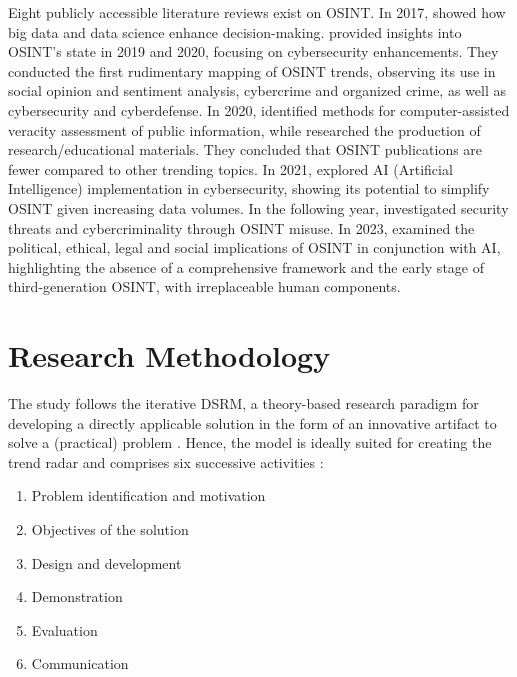 \documentclass[10pt]{article}
\begin{document}
Eight publicly accessible literature reviews exist on OSINT. In 2017, \cite{DosPassos.2017} showed how big data and data science enhance decision-making. \cite{PastorGalindo.2019, PastorGalindo.2020}
provided insights into OSINT's state in 2019 and 2020, focusing on cybersecurity
enhancements. They conducted the first rudimentary mapping of OSINT trends, observing its use in social opinion and sentiment
analysis, cybercrime and organized crime, as well as cybersecurity and cyberdefense. In 2020, \cite{GarciaLozano.2020} identified methods for computer-assisted veracity assessment of public information, while
\cite{HerreraCubides.2020} researched the production of research/educational materials. They concluded that OSINT
publications are fewer compared to other trending topics. In 2021, \cite{Yogish.2021} explored AI (Artificial Intelligence) implementation in cybersecurity,
showing its potential to simplify OSINT given increasing data volumes. In the following year,
\cite{Hwang.2022} investigated security threats and cybercriminality through OSINT misuse.
In 2023, \cite{Ghioni.2023} examined the political, ethical, legal and social implications of
OSINT in conjunction with AI, highlighting the absence of a comprehensive framework and the early stage of third-generation OSINT, with irreplaceable human components.

\section{Research Methodology}

The study follows the iterative DSRM,
a theory-based research paradigm for developing a directly applicable solution in the form of an innovative artifact \cite{vomBrocke.2020b}
to solve a (practical) problem \cite{Peffers.2007}. Hence, the model is ideally suited for creating the trend radar and comprises
six successive activities \cite{Peffers.2007}:

\begin{enumerate}[itemsep=.5pt,parsep=1pt,topsep=1pt]
    \item Problem identification and motivation
    \item Objectives of the solution
    \item Design and development
    \item Demonstration
    \item Evaluation
    \item Communication
\end{enumerate}
\end{document}

